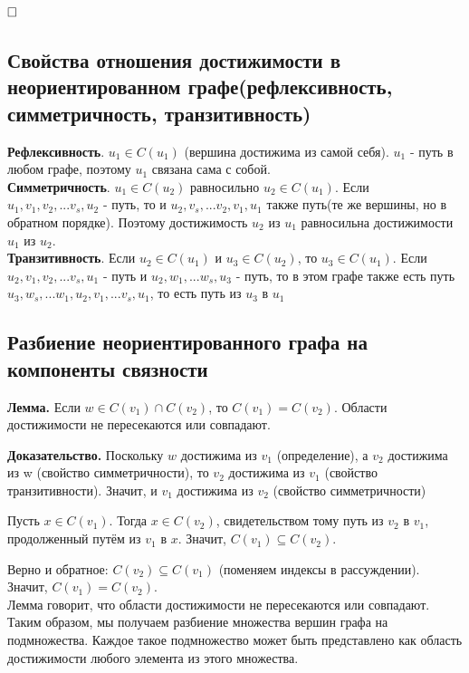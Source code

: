 \documentclass[a4paper, 10pt]{article}
\begin{document}
$\hfill \square$

\subsection{Свойства отношения достижимости в неориентированном графе(рефлексивность, симметричность, транзитивность)}



\textbf{Рефлексивность}. $u_1 \in C(u_1)$ (вершина достижима из самой себя). $u_1$ - путь в любом графе, поэтому $u_1$ связана сама с собой. \\

\textbf{Симметричность}. $u_1 \in C(u_2)$ равносильно $u_2 \in C(u_1)$. Если $u_1, v_1, v_2, ... v_s, u_2$ - путь, то и $u_2, v_s, ... v_2, v_1, u_1$ также путь(те же вершины, но в обратном порядке). Поэтому достижимость $u_2$ из $u_1$ равносильна достижимости $u_1$ из $u_2$. \\

\textbf{Транзитивность}. Если $u_2 \in C(u_1)$ и $u_3 \in C(u_2)$, то $u_3 \in C(u_1)$. Если $u_2, v_1, v_2, ... v_s, u_1$ - путь и $u_2, w_1, ... w_s, u_3$ - путь, то в этом графе также есть путь $u_3, w_s, ... w_1, u_2, v_1, ... v_s, u_1$, то есть путь из $u_3$ в $u_1$


\subsection{Разбиение неориентированного графа на компоненты связности}

\textbf{Лемма.} Если $w \in C(v_1) \cap C(v_2)$, то $C(v_1) = C(v_2)$. Области достижимости не пересекаются или совпадают.

\medskip

\textbf{Доказательство.} Поскольку $w$ достижима из $v_1$ (определение), а $v_2$ достижима из w (свойство симметричности), то $v_2$ достижима из $v_1$ (свойство транзитивности). Значит, и $v_1$ достижима из $v_2$ (свойство симметричности)


Пусть $x \in C(v_1)$. Тогда $x \in C(v_2)$, свидетельством тому путь из $v_2$ в $v_1$, продолженный путём из $v_1$ в $x$. Значит, $C(v_1) \subseteq C(v_2)$.

Верно и обратное: $C(v_2) \subseteq C(v_1)$ (поменяем индексы в рассуждении). Значит, $C(v_1) = C(v_2)$. \\



Лемма говорит, что области достижимости не пересекаются или совпадают. Таким образом, мы получаем разбиение множества вершин графа на подмножества. Каждое такое подмножество может быть представлено как область достижимости любого элемента из этого множества.
\end{document}
